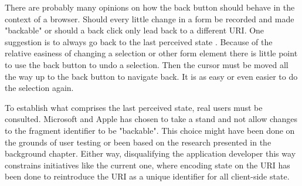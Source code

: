 \documentclass[english]{ifimaster}
\begin{document}
There are probably many opinions on how the back button should behave in the context of a browser. Should every little change in a form be recorded and made "backable" or should a back click only lead back to a different URI. One suggestion is to always go back to the last perceived state \parencite{holst}. Because of the relative easiness of changing a selection or other form element there is little point to use the back button to undo a selection. Then the cursor must be moved all the way up to the back button to navigate back. It is as easy or even easier to do the selection again. 

To establish what comprises the last perceived state, real users must be consulted. Microsoft and Apple has chosen to take a stand and not allow changes to the fragment identifier to be "backable". This choice might have been done on the grounds of user testing or been based on the research presented in the background chapter. Either way, disqualifying the application developer this way constrains initiatives like the current one, where encoding state on the URI has been done to reintroduce the URI as a unique identifier for all client-side state.





\end{document}
